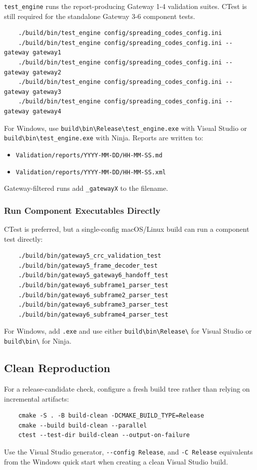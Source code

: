 \documentclass{article}
\begin{document}
\verb|test_engine| runs the report-producing Gateway 1-4 validation suites. CTest is still required for the standalone Gateway 3-6 component tests.
\begin{verbatim}
    ./build/bin/test_engine config/spreading_codes_config.ini
    ./build/bin/test_engine config/spreading_codes_config.ini --gateway gateway1
    ./build/bin/test_engine config/spreading_codes_config.ini --gateway gateway2
    ./build/bin/test_engine config/spreading_codes_config.ini --gateway gateway3
    ./build/bin/test_engine config/spreading_codes_config.ini --gateway gateway4
\end{verbatim}
For Windows, use \verb|build\bin\Release\test_engine.exe| with Visual Studio or \verb|build\bin\test_engine.exe| with Ninja.
Reports are written to:
\begin{itemize}
    \item \verb|Validation/reports/YYYY-MM-DD/HH-MM-SS.md|
    \item \verb|Validation/reports/YYYY-MM-DD/HH-MM-SS.xml|
\end{itemize}
Gateway-filtered runs add \verb|_gatewayX| to the filename.

\subsubsection*{Run Component Executables Directly}

CTest is preferred, but a single-config macOS/Linux build can run a component test directly:
\begin{verbatim}
    ./build/bin/gateway5_crc_validation_test
    ./build/bin/gateway5_frame_decoder_test
    ./build/bin/gateway5_gateway6_handoff_test
    ./build/bin/gateway6_subframe1_parser_test
    ./build/bin/gateway6_subframe2_parser_test
    ./build/bin/gateway6_subframe3_parser_test
    ./build/bin/gateway6_subframe4_parser_test
\end{verbatim}
For Windows, add \verb|.exe| and use either \verb|build\bin\Release\| for Visual Studio or \verb|build\bin\| for Ninja.

\subsection*{Clean Reproduction}

For a release-candidate check, configure a fresh build tree rather than relying on incremental artifacts:
\begin{verbatim}
    cmake -S . -B build-clean -DCMAKE_BUILD_TYPE=Release
    cmake --build build-clean --parallel
    ctest --test-dir build-clean --output-on-failure
\end{verbatim}
Use the Visual Studio generator, \verb|--config Release|, and \verb|-C Release| equivalents from the Windows quick start when creating a clean Visual Studio build.
\end{document}
